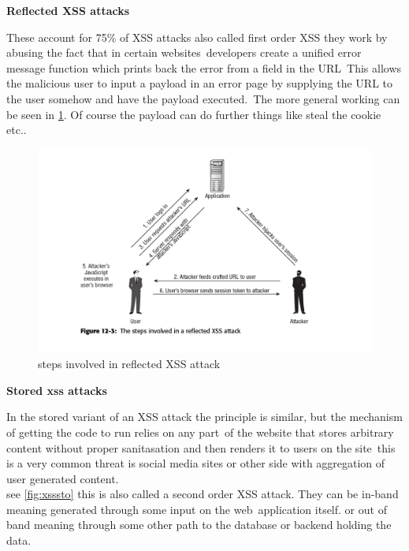 \documentclass[a4paper,12pt]{paper}
\begin{document}
\textbf{Reflected XSS attacks}

These account for 75\% of XSS attacks also called first order XSS they work by abusing the fact that in certain websites\
developers create a unified error message function which prints back the error from a field in the URL\
This allows the malicious user to input a payload in an error page by supplying the URL to the user somehow and have the payload executed.\
The more general working can be seen in \ref{fig:xssref}. Of course the payload can do further things like steal the cookie etc..\

\begin{figure}
\centering
\includegraphics[width=1\textwidth]{refl-XSS.png}
\caption{\label{fig:xssref}steps involved in reflected XSS attack}
\end{figure}

\textbf{Stored xss attacks}

In the stored variant of an XSS attack the principle is similar, but the mechanism of getting the code to run relies on any part\
of the website that stores arbitrary content without proper sanitasation and then renders it to users on the site\
this is a very common threat is social media sites or other side with aggregation of user generated content.\\
see \ref{fig:xsssto} this is also called a second order XSS attack. They can be in-band meaning generated through some input on the web\
application itself. or out of band meaning through some other path to the database or backend holding the data.\
\end{document}
